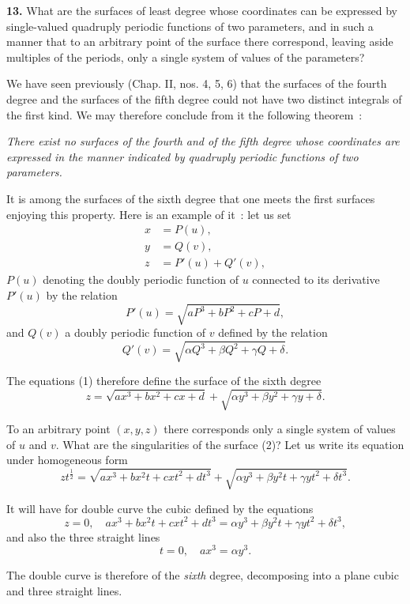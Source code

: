 \documentclass{article}
\begin{document}
\textbf{13.} What are the surfaces of least degree whose coordinates can be expressed by single-valued quadruply periodic functions of two parameters, and in such a manner that to an arbitrary point of the surface there correspond, leaving aside multiples of the periods, only a single system of values of the parameters?

We have seen previously (Chap. II, nos. 4, 5, 6) that the surfaces of the fourth degree and the surfaces of the fifth degree could not have two distinct integrals of the first kind. We may therefore conclude from it the following theorem~:

\emph{There exist no surfaces of the fourth and of the fifth degree whose coordinates are expressed in the manner indicated by quadruply periodic functions of two parameters.}

It is among the surfaces of the sixth degree that one meets the first surfaces enjoying this property. Here is an example of it~: let us set
\[
\begin{aligned}
x &= P(u), \\
y &= Q(v), \\
z &= P'(u) + Q'(v),
\end{aligned}
\tag{1}
\]
$P(u)$ denoting the doubly periodic function of $u$ connected to its derivative $P'(u)$ by the relation
\[
P'(u) = \sqrt{aP^{3} + bP^{2} + cP + d},
\]
and $Q(v)$ a doubly periodic function of $v$ defined by the relation
\[
Q'(v) = \sqrt{\alpha Q^{3} + \beta Q^{2} + \gamma Q + \delta}.
\]

The equations (1) therefore define the surface of the sixth degree
\[
z = \sqrt{ax^{3} + bx^{2} + cx + d} + \sqrt{\alpha y^{3} + \beta y^{2} + \gamma y + \delta}. \tag{2}
\]

To an arbitrary point $(x, y, z)$ there corresponds only a single system of values of $u$ and $v$. What are the singularities of the surface (2)? Let us write its equation under homogeneous form
\[
zt^{\frac{1}{2}} = \sqrt{ax^{3} + bx^{2}t + cxt^{2} + dt^{3}} + \sqrt{\alpha y^{3} + \beta y^{2}t + \gamma yt^{2} + \delta t^{3}}.
\]

It will have for double curve the cubic defined by the equations
\[
z = 0, \quad ax^{3} + bx^{2}t + cxt^{2} + dt^{3} = \alpha y^{3} + \beta y^{2}t + \gamma yt^{2} + \delta t^{3},
\]
and also the three straight lines
\[
t = 0, \quad ax^{3} = \alpha y^{3}.
\]

The double curve is therefore of the \emph{sixth} degree, decomposing into a plane cubic and three straight lines.
\end{document}

